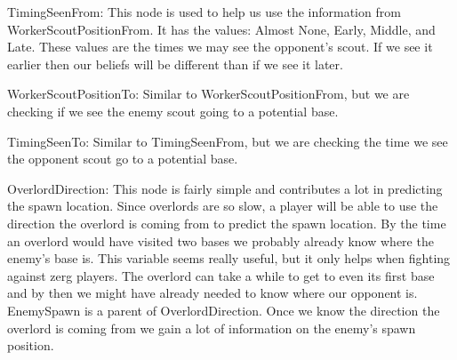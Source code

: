 TimingSeenFrom: This node is used to help us use the information from WorkerScoutPositionFrom. It has the values: Almost None, Early, Middle, and Late. These values are the times we may see the opponent's scout. If we see it earlier then our beliefs will be different than if we see it later.

WorkerScoutPositionTo: Similar to WorkerScoutPositionFrom, but we are checking if we see the enemy scout going to a potential base.

TimingSeenTo: Similar to TimingSeenFrom, but we are checking the time we see the opponent scout go to a potential base.

OverlordDirection: This node is fairly simple and contributes a lot in predicting the spawn location. Since overlords are so slow, a player will be able to use the direction the overlord is coming from to predict the spawn location. By the time an overlord would have visited two bases we probably already know where the enemy's base is. This variable seems really useful, but it only helps when fighting against zerg players. The overlord can take a while to get to even its first base and by then we might have already needed to know where our opponent is. EnemySpawn is a parent of OverlordDirection. Once we know the direction the overlord is coming from we gain a lot of information on the enemy's spawn position.


